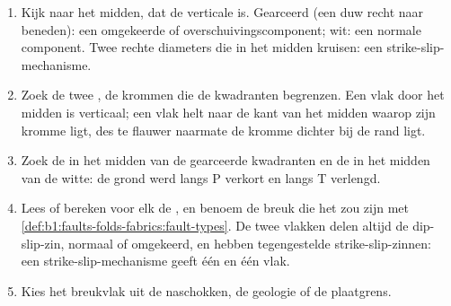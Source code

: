 \begin{method}\label{met:b1:earthquake-source:beachball}
\begin{enumerate}
  \item Kijk naar het midden, dat de verticale is. Gearceerd (een duw recht naar beneden): een omgekeerde of overschuivingscomponent; wit: een normale component. Twee rechte diameters die in het midden kruisen: een strike-slip-mechanisme.
  \item Zoek de twee , de krommen die de kwadranten begrenzen. Een vlak door het midden is verticaal; een vlak helt naar de kant van het midden waarop zijn kromme ligt, des te flauwer naarmate de kromme dichter bij de rand ligt.
  \item Zoek de  in het midden van de gearceerde kwadranten en de  in het midden van de witte: de grond werd langs P verkort en langs T verlengd.
  \item Lees of bereken voor elk  de , en benoem de breuk die het zou zijn met \cref{def:b1:faults-folds-fabrics:fault-types}. De twee vlakken delen altijd de dip-slip-zin, normaal of omgekeerd, en hebben tegengestelde strike-slip-zinnen: een strike-slip-mechanisme geeft één  en één  vlak.
  \item Kies het breukvlak uit de naschokken, de geologie of de plaatgrens.
\end{enumerate}
\end{method}

